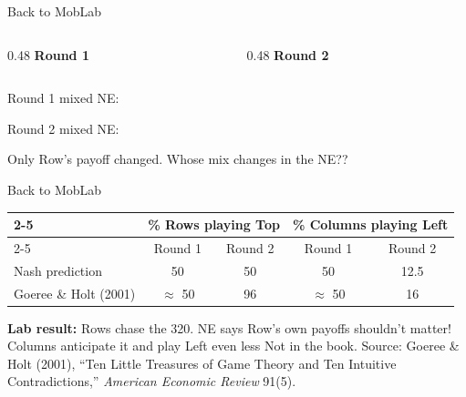 \begin{frame}{Back to MobLab}
\begin{columns}[T]
\begin{column}{0.48\textwidth}
\centering
\textbf{Round 1}\\[4pt]
\begin{matrixgame}[top={Left, Right}, left={Top, Bottom}, player names={Row, Column}]
\end{matrixgame}
\end{column}
\begin{column}{0.48\textwidth}
\centering
\textbf{Round 2}\\[4pt]
\begin{matrixgame}[top={Left, Right}, left={Top, Bottom}, player names={Row, Column}]
\end{matrixgame}
\end{column}
\end{columns}
\bsk
Round 1 mixed NE: \vspace{0.35in}

Round 2 mixed NE: \vspace{0.35in}

Only Row's payoff changed. Whose mix changes in the NE??
\end{frame}


\begin{frame}{Back to MobLab}
\vspace{0.2in}
\centering
\renewcommand{\arraystretch}{2}
\begin{tabular}{l|c|c|c|c|}
\cline{2-5}
 & \multicolumn{2}{c|}{\% Rows playing Top} & \multicolumn{2}{c|}{\% Columns playing Left} \\
\cline{2-5}
 & Round 1 & Round 2 & Round 1 & Round 2 \\
\hline
\multicolumn{1}{|l|}{Nash prediction} & 50 & 50 & 50 & 12.5 \\
\hline
\multicolumn{1}{|l|}{Goeree \& Holt (2001)} & $\approx$ 50 & 96 & $\approx$ 50 & 16 \\
\hline
\end{tabular}
\bsk
\raggedright
\textbf{Lab result:} Rows chase the 320. NE says Row's own payoffs shouldn't matter!\\
Columns anticipate it and play Left even less
\vfill
{\footnotesize Not in the book. Source: Goeree \& Holt (2001), ``Ten Little Treasures of Game Theory and Ten Intuitive Contradictions,'' \textit{American Economic Review} 91(5).}
\vspace{-0.2in}
\end{frame}

